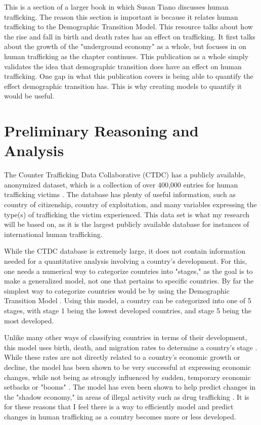 \documentclass{article} %
\begin{document}
This is a section of a larger book in which Susan Tiano discusses human trafficking. The reason this section is important is because it relates human trafficking to the Demographic Transition Model. This resource talks about how the rise and fall in birth and death rates has an effect on trafficking. It first talks about the growth of the "underground economy" as a whole, but focuses in on human trafficking as the chapter continues. This publication as a whole simply validates the idea that demographic transition does have an effect on human trafficking. One gap in what this publication covers is being able to quantify the effect demographic transition has. This is why creating models to quantify it would be useful.

\nocite{SlaveBook}

\section{Preliminary Reasoning and Analysis}

The Counter Trafficking Data Collaborative (CTDC) has a publicly available, anonymized dataset, which is a collection of over 400,000 entries for human trafficking victims \parencite{CTDC}. The database has plenty of useful information, such as country of citizenship, country of exploitation, and many variables expressing the type(s) of trafficking the victim experienced. This data set is what my research will be based on, as it is the largest publicly available database for instances of international human trafficking.

While the CTDC database is extremely large, it does not contain information needed for a quantitative analysis involving a country's development. For this, one needs a numerical way to categorize countries into "stages," as the goal is to make a generalized model, not one that pertains to specific countries. By far the simplest way to categorize countries would be by using the Demographic Transition Model \parencite{bongaarts2009}. Using this model, a country can be categorized into one of 5 stages, with stage 1 being the lowest developed countries, and stage 5 being the most developed.

Unlike many other ways of classifying countries in terms of their development, this model uses birth, death, and migration rates to determine a country's stage \parencite{bongaarts2009}. While these rates are not directly related to a country's economic growth or decline, the model has been shown to be very successful at expressing economic changes, while not being as strongly influenced by sudden, temporary economic setbacks or "booms" \parencite{kirk1996,bar2010,galor2000}. The model has even been shown to help predict changes in the "shadow economy," in areas of illegal activity such as drug trafficking \parencite{sch1994}. It is for these reasons that I feel there is a way to efficiently model and predict changes in human trafficking as a country becomes more or less developed.
\end{document}
